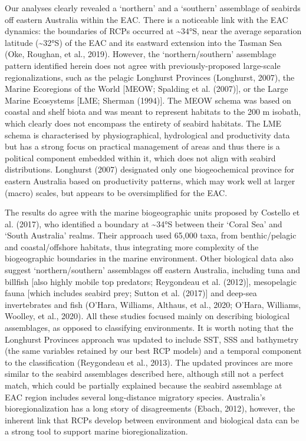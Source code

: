 \documentclass{article}
\begin{document}
Our analyses clearly revealed a `northern' and a `southern' assemblage
of seabirds off eastern Australia within the EAC. There is a noticeable
link with the EAC dynamics: the boundaries of RCPs occurred at
\textasciitilde34°S, near the average separation latitude
(\textasciitilde32°S) of the EAC and its eastward extension into the
Tasman Sea (Oke, Roughan, et al., 2019). However, the
`northern/southern' assemblage pattern identified herein does not agree
with previously-proposed large-scale regionalizations, such as the
pelagic Longhurst Provinces (Longhurst, 2007), the Marine Ecoregions of
the World {[}MEOW; Spalding et al. (2007){]}, or the Large Marine
Ecosystems {[}LME; Sherman (1994){]}. The MEOW schema was based on
coastal and shelf biota and was meant to represent habitats to the 200 m
isobath, which clearly does not encompass the entirety of seabird
habitats. The LME schema is characterised by physiographical,
hydrological and productivity data but has a strong focus on practical
management of areas and thus there is a political component embedded
within it, which does not align with seabird distributions. Longhurst
(2007) designated only one biogeochemical province for eastern Australia
based on productivity patterns, which may work well at larger (macro)
scales, but appears to be oversimplified for the EAC.

The results do agree with the marine biogeographic units proposed by
Costello et al. (2017), who identified a boundary at \textasciitilde34°S
between their `Coral Sea' and `South Australia' realms. Their approach
used 65,000 taxa, from benthic/pelagic and coastal/offshore habitats,
thus integrating more complexity of the biogeographic boundaries in the
marine environment. Other biological data also suggest
`northern/southern' assemblages off eastern Australia, including tuna
and billfish {[}also highly mobile top predators; Reygondeau et al.
(2012){]}, mesopelagic fauna {[}which includes seabird prey; Sutton et
al. (2017){]} and deep-sea invertebrates and fish (O'Hara, Williams,
Althaus, et al., 2020; O'Hara, Williams, Woolley, et al., 2020). All
these studies focused mainly on describing biological assemblages, as
opposed to classifying environments. It is worth noting that the
Longhurst Provinces approach was updated to include SST, SSS and
bathymetry (the same variables retained by our best RCP models) and a
temporal component to the classification (Reygondeau et al., 2013). The
updated provinces are more similar to the seabird assemblages described
here, although still not a perfect match, which could be partially
explained because the seabird assemblage at EAC region includes several
long-distance migratory species. Australia's bioregionalization has a
long story of disagreements (Ebach, 2012), however, the inherent link
that RCPs develop between environment and biological data can be a
strong tool to support marine bioregionalization.
\end{document}
